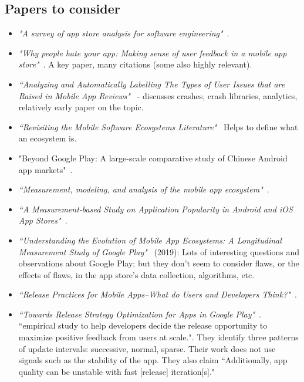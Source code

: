 \subsection{Papers to consider}
\begin{itemize}
    \item \emph{"A survey of app store analysis for software engineering"}~\cite{martin2016survey, martin2017_survey_in_app_store_analysis_for_software_engineering_IEEE_edition}.
    
    \item \emph{"Why people hate your app: Making sense of user feedback in a mobile app store"}~\cite{fu2013people}. A key paper, many citations (some also highly relevant).
    
    \item \emph{``Analyzing and Automatically Labelling The Types of User Issues that are Raised in Mobile App Reviews"}~\cite{mcilroy2016analyzing} - discusses crashes, crash libraries, analytics, relatively early paper on the topic.
    
    \item \emph{``Revisiting the Mobile Software Ecosystems Literature"}~\cite{steglich2019revisiting} Helps to define what an ecosystem is.
    
    \item "Beyond Google Play: A large-scale comparative study of Chinese Android app markets"~\cite{wang2018_beyond_google_play}.
    
    \item \emph{``Measurement, modeling, and analysis of the mobile app ecosystem"}~\cite{petsas2017measurement}.
    
    \item \emph{``A Measurement-based Study on Application Popularity in Android and iOS App Stores"}~\cite{liu2015measurement}.
    
    \item \emph{``Understanding the Evolution of Mobile App Ecosystems: A Longitudinal Measurement Study of Google Play"}~\cite{wang2019understanding} (2019): Lots of interesting questions and observations about Google Play; but they don't seem to consider flaws, or the effects of flaws, in the app store's data collection, algorithms, etc.
    
    \item \emph{``Release Practices for Mobile Apps--What do Users and Developers Think?"}~\cite{nayebi2016release}.
    
    \item \emph{``Towards Release Strategy Optimization for Apps in Google Play"}~\citep{shen2017_towards_release_strategy_optimization_for_apps_in_google_play}. ``empirical study to help developers decide the release opportunity to maximize positive feedback from users at scale.". They identify three patterns of update intervals: successive, normal, sparse. Their work does not use signals such as the stability of the app. They also claim ``Additionally, app quality can be unstable with fast [release] iteration[s]."
    

\end{itemize}
